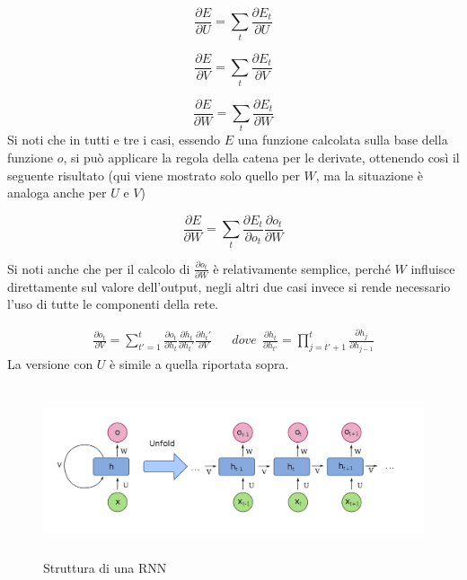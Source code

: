\begin{equation*}
    \frac{\partial E}{\partial U} = \sum_t{\frac{\partial E_t}{\partial U}}
\end{equation*}

\begin{equation*}
    \frac{\partial E}{\partial V} = \sum_t{\frac{\partial E_t}{\partial V}}
\end{equation*}

\begin{equation*}
    \frac{\partial E}{\partial W} = \sum_t{\frac{\partial E_t}{\partial W}}
\end{equation*}
Si noti che in tutti e tre i casi, essendo $E$ una funzione calcolata sulla base della funzione $o$, si può applicare la regola della catena per le derivate, ottenendo così il seguente risultato (qui viene mostrato solo quello per $W$, ma la situazione è analoga anche per $U$ e $V$)

\begin{equation*}
    \frac{\partial E}{\partial W} = \sum_t{\frac{\partial E_t}{\partial o_t}\frac{\partial o_t}{\partial W}}
\end{equation*}

Si noti anche che per il calcolo di $\frac{\partial o_t}{\partial W}$ è relativamente semplice, perché $W$ influisce direttamente sul valore dell'output, negli altri due casi invece si rende necessario l'uso di tutte le componenti della rete.

\begin{align*}
    \frac{\partial o_t}{\partial V} = \sum_{t'=1}^t{\frac{\partial o_t}{\partial h_t}\frac{\partial h_t}{\partial h_t'}\frac{\partial h_t'}{\partial V}}     &&     dove \ \ \frac{\partial h_t}{\partial h_{t'}} = \prod_{j=t'+1}^t {\frac{\partial h_j}{\partial h_{j-1}}}
\end{align*}
La versione con $U$ è simile a quella riportata sopra.



\begin{figure}
    \centering
    \includegraphics[height=5cm]{pictures/Recurrent_neural_network_unfold.png}
    \caption{Struttura di una RNN}
    \label{fig:RNN}
\end{figure}